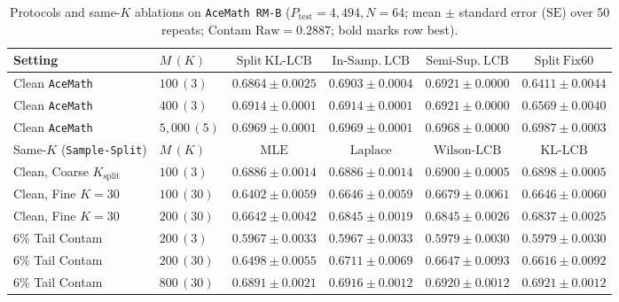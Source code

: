 \documentclass[10pt]{article}
\theoremstyle{plain}
\theoremstyle{definition}
\theoremstyle{remark}
\begin{document}
\begin{table}[htbp]
\centering
\caption{Protocols and same-$K$ ablations on \texttt{AceMath RM-B} ($P_{\mathrm{test}}=4{,}494, N=64$; mean $\pm$ standard error ($\mathrm{SE}$) over 50 repeats; Contam $\mathrm{Raw}=0.2887$; bold marks row best).}
\label{tab:protocols}
\scriptsize
\setlength{\tabcolsep}{3.5pt}
\begin{tabular}{llcccc}
\toprule
Setting & $M\,(K)$ & $\mathrm{Split\ KL\text{-}LCB}$ & $\mathrm{In\text{-}Samp.\ LCB}$ & $\mathrm{Semi\text{-}Sup.\ LCB}$ & $\mathrm{Split\ Fix60}$ \\
\midrule
Clean \texttt{AceMath} & $100\,(3)$   & $0.6864 \pm 0.0025$ & $0.6903 \pm 0.0004$ & $\mathbf{0.6921 \pm 0.0000}$ & $0.6411 \pm 0.0044$ \\
Clean \texttt{AceMath} & $400\,(3)$   & $0.6914 \pm 0.0001$ & $0.6914 \pm 0.0001$ & $\mathbf{0.6921 \pm 0.0000}$ & $0.6569 \pm 0.0040$ \\
Clean \texttt{AceMath} & $5{,}000\,(5)$ & $0.6969 \pm 0.0001$ & $0.6969 \pm 0.0001$ & $0.6968 \pm 0.0000$ & $\mathbf{0.6987 \pm 0.0003}$ \\
\midrule
Same-$K$ (\texttt{Sample-Split}) & $M\,(K)$ & $\mathrm{MLE}$ & $\mathrm{Laplace}$ & $\mathrm{Wilson\text{-}LCB}$ & $\mathrm{KL\text{-}LCB}$ \\
\midrule
Clean, Coarse $K_{\mathrm{split}}$ & $100\,(3)$  & $0.6886 \pm 0.0014$ & $0.6886 \pm 0.0014$ & $\mathbf{0.6900 \pm 0.0005}$ & $0.6898 \pm 0.0005$ \\
Clean, Fine $K=30$                 & $100\,(30)$ & $0.6402 \pm 0.0059$ & $0.6646 \pm 0.0059$ & $\mathbf{0.6679 \pm 0.0061}$ & $0.6646 \pm 0.0060$ \\
Clean, Fine $K=30$                 & $200\,(30)$ & $0.6642 \pm 0.0042$ & $\mathbf{0.6845 \pm 0.0019}$ & $\mathbf{0.6845 \pm 0.0026}$ & $0.6837 \pm 0.0025$ \\
6\% Tail Contam                    & $200\,(3)$  & $0.5967 \pm 0.0033$ & $0.5967 \pm 0.0033$ & $\mathbf{0.5979 \pm 0.0030}$ & $\mathbf{0.5979 \pm 0.0030}$ \\
6\% Tail Contam                    & $200\,(30)$ & $0.6498 \pm 0.0055$ & $\mathbf{0.6711 \pm 0.0069}$ & $0.6647 \pm 0.0093$ & $0.6616 \pm 0.0092$ \\
6\% Tail Contam                    & $800\,(30)$ & $0.6891 \pm 0.0021$ & $0.6916 \pm 0.0012$ & $0.6920 \pm 0.0012$ & $\mathbf{0.6921 \pm 0.0012}$ \\
\bottomrule
\end{tabular}
\end{table}
\end{document}

